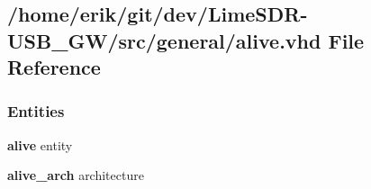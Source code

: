 \subsection{/home/erik/git/dev/\+Lime\+S\+D\+R-\/\+U\+S\+B\+\_\+\+G\+W/src/general/alive.vhd File Reference}
\label{alive_8vhd}
\subsubsection*{Entities}
\begin{DoxyCompactItemize}
\item 
{\bf alive} entity
\item 
{\bf alive\+\_\+arch} architecture
\end{DoxyCompactItemize}
